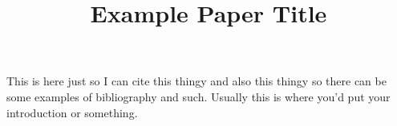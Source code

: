 \documentclass{article}
\title{Example Paper Title}	%
\begin{document}
\maketitlepage
\newpage

\tableofcontents
\newpage

\begin{abstract}
	\blindtext[3] %
\end{abstract}
\newpage

\makeheader	%
\maketitle	%

This is here just so I can cite this thingy \cite{Kavanaugh1976} and also this thingy \cite{Saussure1995} so there can be some examples of bibliography and such. Usually this is where you'd put your introduction or something.
\blinddocument

\newpage
\makeworkscited
\end{document}
